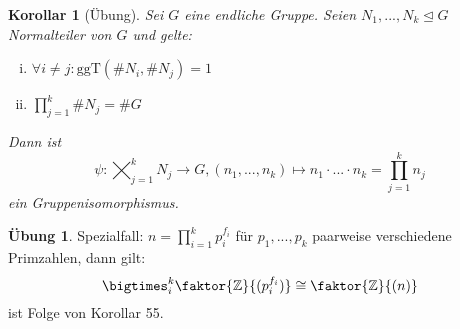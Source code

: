\documentclass[a4paper]{report}
\theoremstyle{plain}
\newtheorem{kor}[thm]{Korollar}
\theoremstyle{definition}
\newtheorem*{ubng*}{Übung}
\begin{document}
\begin{kor}[Übung]
  Sei $G$ eine endliche Gruppe. Seien $N_{1}, ..., N_{k} \trianglelefteq G$ Normalteiler von $G$ und gelte:
  \begin{enumerate}[(i)]
    \item $\forall i \ne j : \mathrm{ggT}(\#N_{i}, \#N_{j}) = 1$
    \item $\prod_{j=1}^k \# N_{j} = \#G$
  \end{enumerate}
  Dann ist $$\psi : \bigtimes_{j=1}^{k}N_{j} \longrightarrow G, (n_{1}, ..., n_{k}) \longmapsto n_{1}\cdot ... \cdot n_{k} = \prod_{j=1}^{k}n_{j}$$
  ein Gruppenisomorphismus.
\item
\end{kor}
\begin{ubng*}
Spezialfall: $n = \prod_{i=1}^{k}p_{i}^{f_{i}}$ für $p_{1}, ..., p_{k}$ paarweise verschiedene Primzahlen, dann gilt:
$$\bigtimes_{i}^{k}\faktor{\Bbb Z}{(p_{i}^{f_{i}})} \cong \faktor{\Bbb Z}{(n)}$$
ist Folge von Korollar 55.
\end{ubng*}
\end{document}
